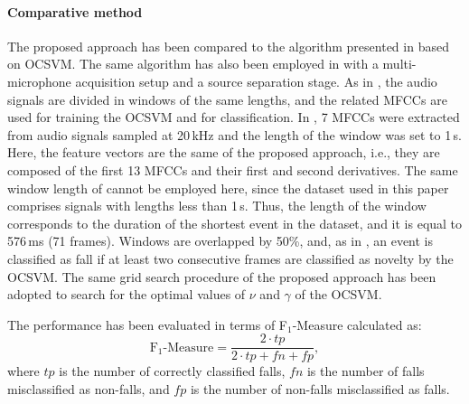 \paragraph{Comparative method}
\label{par:popescu_mod}
The proposed approach has been compared to the algorithm presented in \cite{Popescu2009} based on OCSVM. The same algorithm has also been employed in \cite{khan2015unsupervised} with a multi-microphone acquisition setup and a source separation stage. As in \cite{Popescu2009}, the audio signals are divided in windows of the same lengths, and the related MFCCs are used for training the OCSVM and for classification. In \cite{Popescu2009}, 7 MFCCs were extracted from audio signals sampled at 20\,kHz and the length of the window was set to 1\,s. Here, the feature vectors are the same of the proposed approach, i.e., they are composed of the first 13 MFCCs and their first and second derivatives. The same window length of \cite{Popescu2009} cannot be employed here, since the dataset used in this paper comprises signals with lengths less than 1\,s. Thus, the length of the window corresponds to the duration of the shortest event in the dataset, and it is equal to 576\,ms (71 frames). Windows are overlapped by 50\%, and, as in \cite{Popescu2009}, an event is classified as fall if at least two consecutive frames are classified as novelty by the OCSVM. The same grid search procedure of the proposed approach has been adopted to search for the optimal values of $\nu$ and $\gamma$ of the OCSVM.


The performance has been evaluated in terms of F$_1$-Measure calculated as:
\begin{equation}
\label{eq:f1}
\text{F}_1\text{-Measure} = \frac{2\cdot tp}{2\cdot tp+fn+fp},
\end{equation}
where $tp$ is the number of correctly classified falls, $fn$ is the number of falls misclassified as non-falls, and $fp$ is the number of non-falls misclassified as falls.



